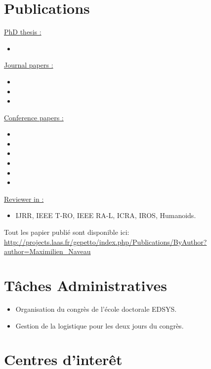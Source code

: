 \documentclass[11pt,a4paper]{moderncv}
\newcommand{\items}{\item \hspace{2mm}}
\begin{document}
\section{Publications}

\large{\underline{PhD thesis :}}

\begin{itemize}%
\items {}
\end{itemize}

\large{\underline{Journal papers :}}

\begin{itemize}%
\items {}
\items {}
\items {}
\end{itemize}%


\large{\underline{Conference papers :}}

\begin{itemize}%
\items {}
\items {}
\items {}
\items {}
\items {}
\items {}
\end{itemize}


\large{\underline{Reviewer in :}}
\begin{itemize}%
\items IJRR, IEEE T-RO, IEEE RA-L, ICRA, IROS, Humanoids.
\end{itemize}

\vspace*{1cm}

Tout les papier publi\'e sont disponible ici:
\url{http://projects.laas.fr/gepetto/index.php/Publications/ByAuthor?author=Maximilien_Naveau}\\

\section{T\^aches Administratives}

{
\begin{itemize}
\items Organisation du congr\`es de l'\'ecole doctorale EDSYS.
\items Gestion de la logistique pour les deux jours du congr\`es.
\end{itemize}
}


\section{Centres d'inter\^et}

\end{document}
